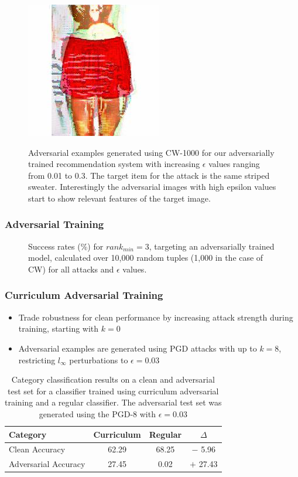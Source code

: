 \documentclass{beamer}
\begin{document}
\begin{frame}
\begin{figure}[H]
{				\includegraphics[height=0.18\textwidth]{../thesis/images/adv/adversarial-24-epochs/cw/0.3/attack}
			}
			\caption{Adversarial examples generated using CW-1000 for our adversarially trained recommendation system with increasing $\epsilon$ values ranging from 0.01 to 0.3. The target item for the attack is the same striped sweater. Interestingly the adversarial images with high epsilon values start to show relevant features of the target image.}
			\label{fig:epsilon-adv}
		\end{figure}
	\end{frame}
	
	
	
	\begin{frame}
		\frametitle{Adversarial Training}
		\begin{figure}[H]
			\centering
			\resizebox{\textwidth}{!}{}
			\caption{Success rates (\%) for $rank_{min}=3$, targeting an adversarially trained model, calculated over 10,000 random tuples (1,000 in the case of CW) for all attacks and $\epsilon$ values.}
			\label{fig:top3-adv-success}
		\end{figure}
	\end{frame}
	
	\begin{frame}
		\frametitle{Curriculum Adversarial Training}
		\begin{itemize}
			\item Trade robustness for clean performance by increasing attack strength during training, starting with $k=0$
			\item Adversarial examples are generated using PGD attacks with up to $k=8$, restricting $l_\infty$ perturbations to $\epsilon=0.03$
		\end{itemize}
		\begin{table}[H]
			\centering
			\label{tab:curr-adv-category-results}
			\begin{tabular}{ lccc } 
				\toprule		
				Category          & Curriculum & Regular & $\Delta$\\
				\midrule
				Clean Accuracy	      & 62.29 & 68.25 & $-$ 5.96 \\
				Adversarial Accuracy  & 27.45 & 0.02  & $+$ 27.43 \\
				\bottomrule
			\end{tabular}
			\caption{Category classification results on a clean and adversarial test set for a classifier trained using curriculum adversarial training and a regular classifier. The adversarial test set was generated using the PGD-8 with $\epsilon=0.03$}
		\end{table}
	\end{frame}
	
\end{document}
